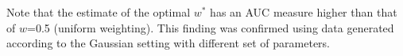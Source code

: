 \documentclass[12pt]{article} %
\begin{document}

Note that   the estimate of the optimal $w^{*}$  has  an AUC measure higher than  that of $w$=0.5 (uniform weighting). This finding was confirmed using data generated 
according to  the Gaussian setting with different set of parameters.
\end{document}
